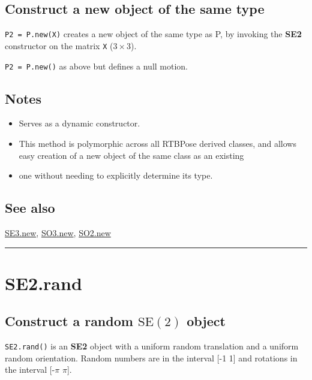 \subsection*{Construct a new object of the same type}


\texttt{P2 = P.new(X)} creates a new object of the same type as P, by invoking the \textbf{\color{red} SE2} constructor on the matrix
\texttt{X} ($3 \times 3$).



\texttt{P2 = P.new()} as above but defines a null motion.


\subsection*{Notes}
\begin{itemize}
  \item Serves as a dynamic constructor.
  \item This method is polymorphic across all RTBPose derived classes, and     allows easy creation of a new object of the same class as an existing
  \item one without needing to explicitly determine its type.
\end{itemize}

\subsection*{See also}


\hyperlink{SE3.new}{\color{blue} SE3.new}, \hyperlink{SO3.new}{\color{blue} SO3.new}, \hyperlink{SO2.new}{\color{blue} SO2.new}

\vspace{1.5ex}\hrule

\hypertarget{SE2.rand}{\section*{SE2.rand}}
\subsection*{Construct a random $\mbox{SE}(2)$ object}


\texttt{SE2.rand()} is an \textbf{\color{red} SE2} object with a uniform random translation and a
uniform random orientation.  Random numbers are in the interval [-1 1]
and rotations in the interval [-$\pi$ $\pi$].


